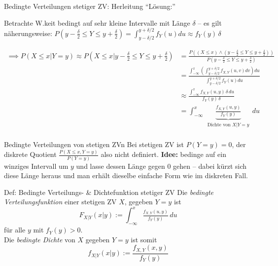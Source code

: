 \documentclass[
  10pt,
  ignorenonframetext,
]{beamer}
\begin{document}
\begin{frame}{Bedingte Verteilungen stetiger ZV: Herleitung}
\protect\hypertarget{bedingte-verteilungen-stetiger-zv-herleitung}{}
``Lösung:''

Betrachte W.keit bedingt auf sehr kleine Intervalle mit Länge \(\delta\)
-- es gilt näherungsweise:
\(P(y-\tfrac{\delta}{2} \leq Y \leq y + \tfrac{\delta}{2}) = \int^{y + \delta/2}_{y-\delta/2} f_Y(u)du \approx f_Y(y) \, \delta\)

\begin{small}
\begin{align*}
\implies P(X \leq x| Y = y) \approx P(X \leq x| y-\tfrac{\delta}{2} \leq Y \leq y + \tfrac{\delta}{2}) &=  \frac{P\left((X \leq x) \land (y-\tfrac{\delta}{2} \leq Y \leq y + \tfrac{\delta}{2})\right)}
{P(y-\tfrac{\delta}{2} \leq Y \leq y + \tfrac{\delta}{2})} \\
  &=  \frac{\int_{-\infty}^x \left(\int^{y + \delta/2}_{y-\delta/2} f_{X,Y}(u, v) dv\right) du}{\int^{y + \delta/2}_{y-\delta/2} f_Y(u)du}\\
& \approx  \frac{\int_{-\infty}^x f_{X,Y}(u,y) \, \delta \, du} {f_Y(y) \, \delta} \\
& =  \int_{-\infty}^x \,\underbrace{\frac{f_{X,Y}(u,y)}{f_Y(y)}}_{\substack{\text{Dichte von $X | Y = y$}\\}} \,du
\end{align*}
\end{small}
\end{frame}

\begin{frame}{Bedingte Verteilungen von stetigen ZVn}
\protect\hypertarget{bedingte-verteilungen-von-stetigen-zvn}{}
Bei stetigen ZV ist \(P(Y = y) = 0\), der diskrete Quotient
\(\tfrac{P(X\le x, Y=y)}{P(Y=y)}\) also nicht definiert. \textbf{Idee:}
bedinge auf ein winziges Intervall um \(y\) und lasse dessen Länge gegen
\(0\) gehen -- dabei kürzt sich diese Länge heraus und man erhält
dieselbe einfache Form wie im diskreten Fall.

\begin{block}{Def: Bedingte Verteilungs- \& Dichtefunktion stetiger ZV}
\protect\hypertarget{def-bedingte-verteilungs--dichtefunktion-stetiger-zv}{}
Die \emph{bedingte Verteilungsfunktion} einer stetigen ZV \(X\), gegeben
\(Y = y\) ist \[
F_{X|Y}(x|y) := \int_{-\infty}^x \tfrac{f_{X,Y}(u,y)}{f_Y(y)} \, du
\] für alle \(y\) mit \(f_Y(y) > 0\).\\
Die \emph{bedingte Dichte} von \(X\) gegeben \(Y = y\) ist somit \[
f_{X|Y}(x|y) := \frac{f_{X,Y}(x,y)}{f_Y(y)}
\]
\end{block}
\end{frame}
\end{document}

